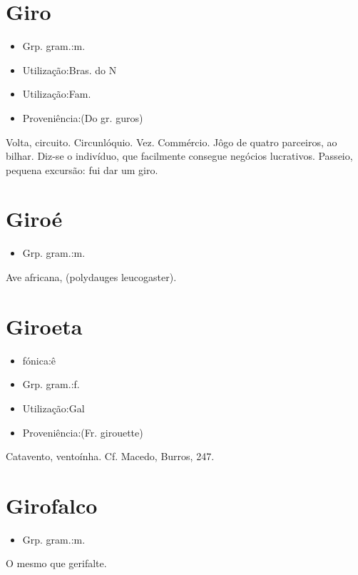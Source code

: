 \section{Giro}
\begin{itemize}
\item {Grp. gram.:m.}
\end{itemize}
\begin{itemize}
\item {Utilização:Bras. do N}
\end{itemize}
\begin{itemize}
\item {Utilização:Fam.}
\end{itemize}
\begin{itemize}
\item {Proveniência:(Do gr. \textunderscore guros\textunderscore )}
\end{itemize}
Volta, circuito.
Circunlóquio.
Vez.
Commércio.
Jôgo de quatro parceiros, ao bilhar.
Diz-se o indivíduo, que facilmente consegue negócios lucrativos.
Passeio, pequena excursão: \textunderscore fui dar um giro\textunderscore .
\section{Giroé}
\begin{itemize}
\item {Grp. gram.:m.}
\end{itemize}
Ave africana, (\textunderscore polydauges leucogaster\textunderscore ).
\section{Giroeta}
\begin{itemize}
\item {fónica:ê}
\end{itemize}
\begin{itemize}
\item {Grp. gram.:f.}
\end{itemize}
\begin{itemize}
\item {Utilização:Gal}
\end{itemize}
\begin{itemize}
\item {Proveniência:(Fr. \textunderscore girouette\textunderscore )}
\end{itemize}
Catavento, ventoínha. Cf. Macedo, \textunderscore Burros\textunderscore , 247.
\section{Girofalco}
\begin{itemize}
\item {Grp. gram.:m.}
\end{itemize}
O mesmo que \textunderscore gerifalte\textunderscore .
